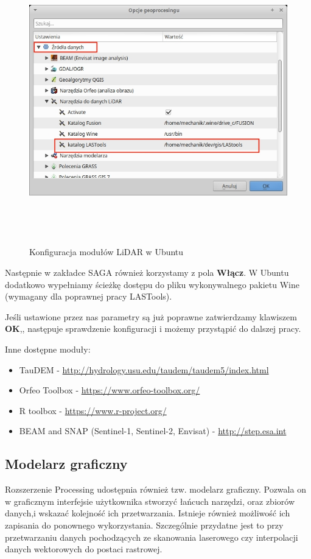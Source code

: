 \documentclass[12pt,a4paper]{book}
\begin{document}
\begin{figure}[ht]
	\centering
	\includegraphics[width=16.838cm,height=12.457cm]{002-lidar.jpg}
	\caption{Konfiguracja modułów LiDAR w Ubuntu}
\end{figure}
Następnie w zakładce SAGA również korzystamy z pola \textbf{Włącz}. W Ubuntu dodatkowo wypełniamy ścieżkę dostępu do pliku wykonywalnego pakietu Wine (wymagany dla poprawnej pracy LASTools).

Jeśli ustawione przez nas parametry są już poprawne zatwierdzamy klawiszem \textbf{OK},, następuje sprawdzenie konfiguracji i możemy przystąpić do dalszej pracy.

Inne dostępne moduły:
\begin{itemize}
\item TauDEM - \url{http://hydrology.usu.edu/taudem/taudem5/index.html}
\item Orfeo Toolbox - \url{https://www.orfeo-toolbox.org/}
\item R toolbox - \url{https://www.r-project.org/}
\item BEAM and SNAP (Sentinel-1, Sentinel-2, Envisat) - \url{http://step.esa.int}
\end{itemize}
\subsection{Modelarz graficzny}
Rozszerzenie Processing udostępnia również tzw. modelarz graficzny. Pozwala on w graficznym interfejsie użytkownika stworzyć łańcuch narzędzi, oraz zbiorów danych,i wskazać kolejność ich przetwarzania. Istnieje również możliwość ich zapisania do ponownego wykorzystania. Szczególnie przydatne jest to przy przetwarzaniu danych pochodzących ze skanowania laserowego czy interpolacji danych wektorowych do postaci rastrowej.
\end{document}
